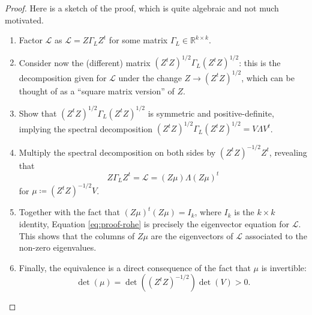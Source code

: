 \documentclass[../../main.tex]{subfiles} %
\begin{document}
	\begin{proof}
		Here is a sketch of the proof, which is quite algebraic and not much 
		motivated.
		\begin{enumerate}
			\item Factor \(\mathscr L\) as \(\mathscr L = Z \Gamma_L Z^t\) for 
			some matrix \(\Gamma_L \in \mathbb R^{k \times k}\).
			\item Consider now the (different) matrix \((Z^t Z)^{1/2} \Gamma_L 
			(Z^t Z)^{1/2}\): 
			this is the decomposition given for \(\mathscr L\) under 
			the change \(Z \to (Z^t Z)^{1/2}\), which can be thought of as a 
			``square matrix version'' of \(Z\).
			\item Show that \((Z^t Z)^{1/2} \Gamma_L (Z^t Z)^{1/2}\) is 
			symmetric and positive-definite, implying the spectral 
			decomposition 
			\((Z^t Z)^{1/2} \Gamma_L (Z^t Z)^{1/2} = V \Lambda V^t\).
			\item Multiply the spectral decomposition on both sides by \((Z^t 
			Z)^{-1/2} Z^t\), revealing that
			\begin{equation} \label{eq:proof-rohe}
				Z \Gamma_L Z^t = \mathscr L = (Z \mu) \Lambda (Z \mu)^t
			\end{equation}
			for \(\mu \coloneqq (Z^t Z)^{-1/2} V\).
			\item Together with the fact that \((Z \mu)^t (Z \mu) = I_k\), 
			where \(I_k\) is the \(k \times k\) identity, Equation 
			\ref{eq:proof-rohe} is precisely the eigenvector equation for 
			\(\mathscr L\). This shows that the columns of \(Z \mu\) are the 
			eigenvectors of \(\mathscr L\) associated to the non-zero 
			eigenvalues.
			\item Finally, the equivalence is a direct consequence of the fact 
			that \(\mu\) is invertible:
			\begin{equation*}
				\det(\mu) = \det((Z^t Z)^{-1/2}) \det(V) > 0.
			\end{equation*} 
		\end{enumerate}

	\end{proof}
	
\end{document}
